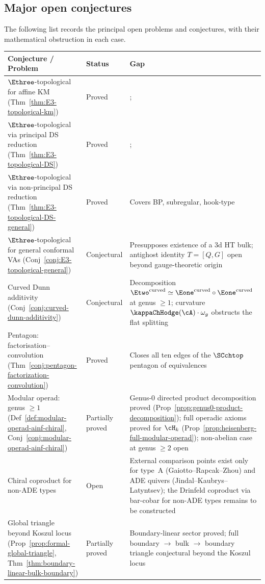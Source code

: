 \subsection{Major open conjectures}
\label{subsec:major-open-conjectures}

The following list records the principal open problems and conjectures,
with their mathematical obstruction in each case.

\begin{center}
\small
\renewcommand{\arraystretch}{1.3}
\begin{tabular}{@{}p{4.8cm}lp{5.2cm}@{}}
\textbf{Conjecture / Problem} & \textbf{Status} & \textbf{Gap} \\
\hline
$\Ethree$-topological for affine KM
 (Thm~\ref{thm:E3-topological-km})
 & Proved
 &; \\
$\Ethree$-topological via principal DS reduction
 (Thm~\ref{thm:E3-topological-DS})
 & Proved
 &; \\
$\Ethree$-topological via non-principal DS reduction
 (Thm~\ref{thm:E3-topological-DS-general})
 & Proved
 & Covers BP, subregular, hook-type \\
$\Ethree$-topological for general conformal VAs
 (Conj~\ref{conj:E3-topological-general})
 & Conjectural
 & Presupposes existence of a 3d HT bulk;
 antighost identity $T = [Q, G]$ open
 beyond gauge-theoretic origin \\
Curved Dunn additivity
 (Conj~\ref{conj:curved-dunn-additivity})
 & Conjectural
 & Decomposition $\Etwo^{\mathrm{curved}}
 \simeq \Eone^{\mathrm{curved}} \circ
 \Eone^{\mathrm{curved}}$ at genus $\ge 1$;
 curvature $\kappaChHodge(\cA) \cdot \omega_g$ obstructs
 the flat splitting \\
Pentagon: factorisation--convolution
 (Thm~\ref{conj:pentagon-factorization-convolution})
 & Proved
 & Closes all ten edges of the $\SCchtop$ pentagon
 of equivalences \\
Modular operad: genus $\ge 1$
 (Def~\ref{def:modular-operad-ainf-chiral},
 Conj~\ref{conj:modular-operad-ainf-chiral})
 & Partially proved
 & Genus-$0$ directed product decomposition proved
 (Prop~\ref{prop:genus0-product-decomposition});
 full operadic axioms proved for $\cH_k$
 (Prop~\ref{prop:heisenberg-full-modular-operad});
 non-abelian case at genus $\ge 2$ open \\
Chiral coproduct for non-ADE types
 & Open
 & External comparison points exist only for
 type~A (Gaiotto--Rapcak--Zhou) and ADE
 quivers (Jindal--Kaubrys--Latyntsev);
 the Drinfeld coproduct via bar-cobar for
 non-ADE types remains to be constructed \\
Global triangle beyond Koszul locus
 (Prop~\ref{prop:formal-global-triangle},
 Thm~\ref{thm:boundary-linear-bulk-boundary})
 & Partially proved
 & Boundary-linear sector proved;
 full boundary $\to$ bulk $\to$ boundary
 triangle conjectural beyond the Koszul
 locus \\
\end{tabular}
\end{center}

